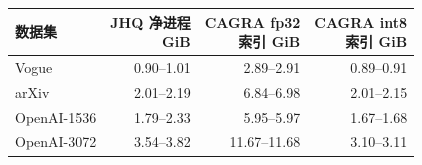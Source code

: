 \begin{tabular}{@{}lrrr@{}}
\toprule
数据集 & \shortstack{JHQ 净进程\\GiB} & \shortstack{CAGRA fp32\\索引 GiB} & \shortstack{CAGRA int8\\索引 GiB} \\
\midrule
Vogue & 0.90--1.01 & 2.89--2.91 & 0.89--0.91 \\
arXiv & 2.01--2.19 & 6.84--6.98 & 2.01--2.15 \\
OpenAI-1536 & 1.79--2.33 & 5.95--5.97 & 1.67--1.68 \\
OpenAI-3072 & 3.54--3.82 & 11.67--11.68 & 3.10--3.11 \\
\bottomrule
\end{tabular}
